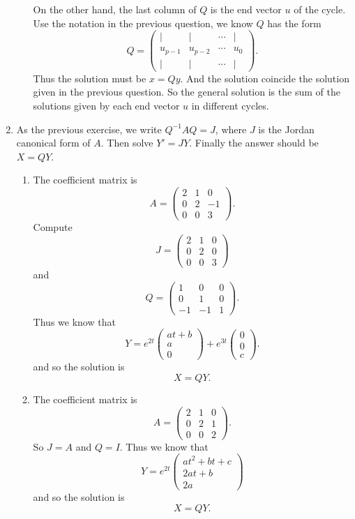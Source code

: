 \begin{enumerate}
\begin{enumerate}
On the other hand, the last column of $Q$ is the end vector $u$ of the cycle. Use the notation in the previous question, we know $Q$ has the form 
\[Q=\begin{pmatrix} | & | & \cdots & | \\ u_{p-1} & u_{p-2} & \cdots & u_0 \\ | & | & \cdots & | \end{pmatrix}.\]
Thus the solution must be $x=Qy$. And the solution coincide the solution given in the previous question. So the general solution is the sum of the solutions given by each end vector $u$ in different cycles.
\end{enumerate}
\item As the previous exercise, we write $Q^{-1}AQ=J$, where $J$ is the Jordan canonical form of $A$. Then solve $Y'=JY$. Finally the answer should be $X=QY$.
\begin{enumerate}
\item The coefficient matrix is 
\[A=\begin{pmatrix}2&1&0\\0&2&-1\\0&0&3\end{pmatrix}.\]
Compute 
\[J=\begin{pmatrix}2&1&0\\0&2&0\\0&0&3\end{pmatrix}\]
and 
\[Q=\begin{pmatrix}1&0&0\\0&1&0\\-1&-1&1\end{pmatrix}.\]
Thus we know that 
\[Y=e^{2t}\begin{pmatrix}at+b\\a\\0\end{pmatrix}+e^{3t}\begin{pmatrix}0\\0\\c\end{pmatrix}.\]
and so 
the solution is 
\[X=QY.\]
\item The coefficient matrix is 
\[A=\begin{pmatrix}2&1&0\\0&2&1\\0&0&2\end{pmatrix}.\]
So $J=A$ and $Q=I$. Thus we know that 
\[Y=e^{2t}\begin{pmatrix}at^2+bt+c\\2at+b\\2a\end{pmatrix}\]
and so 
the solution is 
\[X=QY.\]
\end{enumerate}
\end{enumerate}